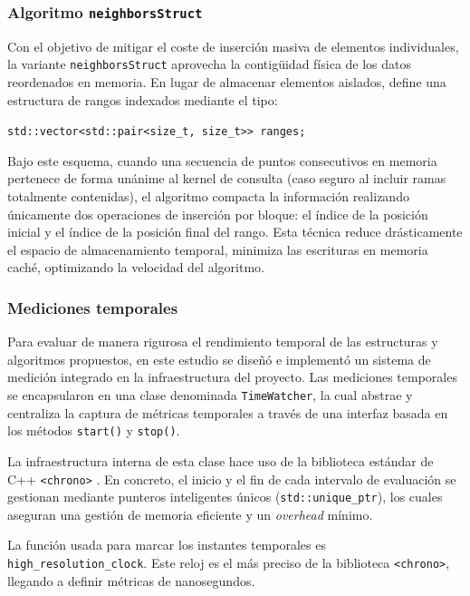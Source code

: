 \subsubsection{Algoritmo \texttt{neighborsStruct}}
Con el objetivo de mitigar el coste de inserción masiva de elementos individuales, la variante \texttt{neighborsStruct} aprovecha la contigüidad física de los datos reordenados en memoria. En lugar de almacenar elementos aislados, define una estructura de rangos indexados mediante el tipo:
\begin{center}
    \texttt{std::vector\textless{}std::pair\textless{}size\_t, size\_t\textgreater{}\textgreater{} ranges;}
\end{center}

Bajo este esquema, cuando una secuencia de puntos consecutivos en memoria pertenece de forma unánime al kernel de consulta (caso seguro al incluir ramas totalmente contenidas), el algoritmo compacta la información realizando únicamente dos operaciones de inserción por bloque: el índice de la posición inicial y el índice de la posición final del rango. Esta técnica reduce drásticamente el espacio de almacenamiento temporal, minimiza las escrituras en memoria caché, optimizando la velocidad del algoritmo.

\subsubsection{Mediciones temporales}

Para evaluar de manera rigurosa el rendimiento temporal de las estructuras y algoritmos propuestos, en este estudio se diseñó e implementó un sistema de medición integrado en la infraestructura del proyecto. Las mediciones temporales se encapsularon en una clase denominada \texttt{TimeWatcher}, la cual abstrae y centraliza la captura de métricas temporales a través de una interfaz basada en los métodos \texttt{start()} y \texttt{stop()}.

La infraestructura interna de esta clase hace uso de la biblioteca estándar de C++ \texttt{<chrono>} \cite{clock}. En concreto, el inicio y el fin de cada intervalo de evaluación se gestionan mediante punteros inteligentes únicos (\texttt{std::unique\_ptr}), los cuales aseguran una gestión de memoria eficiente y un \textit{overhead} mínimo.

La función usada para marcar los instantes temporales es \texttt{high\_resolution\_clock}. Este reloj es el más preciso de la biblioteca \texttt{<chrono>}, llegando a definir métricas de nanosegundos.

